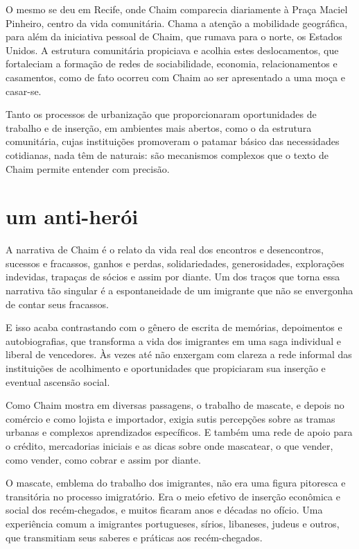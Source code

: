 O mesmo se deu em Recife,
onde Chaim comparecia diariamente à Praça Maciel Pinheiro, centro da
vida comunitária. Chama a atenção a
mobilidade geográfica, para além da iniciativa pessoal de Chaim, que
rumava para o norte, os Estados Unidos. A estrutura comunitária
propiciava e acolhia estes deslocamentos, que fortaleciam a formação de
redes de sociabilidade, economia, relacionamentos e casamentos, como de
fato ocorreu com Chaim ao ser apresentado a uma moça e casar-se.%

Tanto os processos de urbanização que proporcionaram oportunidades de
trabalho e de inserção, em ambientes mais abertos, como o da estrutura
comunitária, cujas instituições promoveram o patamar básico das
necessidades cotidianas, nada têm de naturais: são mecanismos complexos
que o texto de Chaim permite entender com precisão.

\section{um anti-herói}

A narrativa de Chaim é o relato da vida real dos encontros e
desencontros, sucessos e fracassos, ganhos e perdas, solidariedades,
generosidades, explorações indevidas, trapaças de sócios e assim por
diante. Um dos traços que torna essa narrativa tão singular é a
espontaneidade de um imigrante que não se envergonha de contar seus
fracassos.

E isso acaba contrastando com o gênero de escrita de memórias,
depoimentos e autobiografias, que transforma a vida dos imigrantes em uma
saga individual e liberal de vencedores. Às vezes até não
enxergam com clareza a rede informal das instituições de acolhimento e
oportunidades que propiciaram sua inserção e eventual ascensão social.

Como Chaim mostra em diversas passagens, o trabalho de mascate, e depois no comércio e
como lojista e importador, exigia sutis percepções sobre as tramas
urbanas e complexos aprendizados específicos. E também uma rede de apoio
para o crédito, mercadorias iniciais e as dicas sobre onde mascatear, o que vender, como vender, como cobrar e assim por diante. 

O mascate, emblema do trabalho dos imigrantes, não era uma
figura pitoresca e transitória no processo imigratório. Era o meio
efetivo de inserção econômica e social dos recém-chegados, e muitos
ficaram anos e décadas no ofício. Uma experiência comum a imigrantes
portugueses, sírios, libaneses, judeus e outros, que transmitiam seus
saberes e práticas aos recém-chegados.

